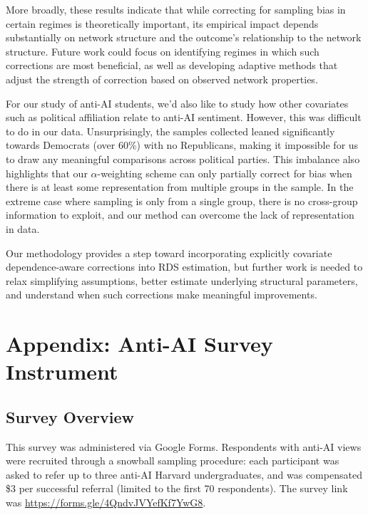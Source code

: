 \documentclass[11pt,a4paper,twocolumn,twoside]{rho-class/rho}
\begin{document}
More broadly, these results indicate that while correcting for sampling bias in certain regimes is theoretically important, its empirical impact depends substantially on network structure and the outcome's relationship to the network structure. Future work could focus on identifying regimes in which such corrections are most beneficial, as well as developing adaptive methods that adjust the strength of correction based on observed network properties.

For our study of anti-AI students, we'd also like to study how other covariates such as political affiliation relate to anti-AI sentiment. However, this was difficult to do in our data. Unsurprisingly, the samples collected leaned significantly towards Democrats (over 60\%) with no Republicans, making it impossible for us to draw any meaningful comparisons across political parties. This imbalance also highlights that our $\alpha$-weighting scheme can only partially correct for bias when there is at least some representation from multiple groups in the sample. In the extreme case where sampling is only from a single group, there is no cross-group information to exploit, and our method can overcome the lack of representation in data.

Our methodology provides a step toward incorporating explicitly covariate dependence-aware corrections into RDS estimation, but further work is needed to relax simplifying assumptions, better estimate underlying structural parameters, and understand when such corrections make meaningful improvements.

\newpage

\printbibliography

\section*{Appendix: Anti-AI Survey Instrument}
\label{app:survey}

\subsection*{Survey Overview}

This survey was administered via Google Forms. Respondents with anti-AI views were recruited through a snowball sampling procedure: each participant was asked to refer up to three anti-AI Harvard undergraduates, and was compensated \$3 per successful referral (limited to the first 70 respondents). The survey link was \url{https://forms.gle/4QndvJVYefKf7YwG8}.
\end{document}
